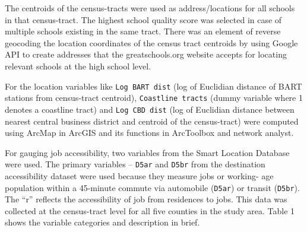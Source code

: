 \documentclass[10pt,letterpaper,onecolumn]{article}
\begin{document}
The centroids of the census-tracts were used as address/locations for all schools in that
census-tract. The highest school quality score was selected in case of
multiple schools existing in the same tract. There was an element of
reverse geocoding the location coordinates of the census tract centroids
by using Google API to create addresses that the greatschools.org
website accepts for locating relevant schools at the high school level.

For the location variables like \texttt{Log BART dist} (log of Euclidian
distance of BART stations from census-tract centroid), \texttt{Coastline
tracts} (dummy variable where 1 denotes a coastline tract) and \texttt{Log
CBD dist} (log of Euclidian distance between nearest central business
district and centroid of the census-tract) were computed using ArcMap in
ArcGIS and its functions in ArcToolbox and network analyst.

For gauging job accessibility, two variables from the Smart Location
Database were used. The primary variables -- \texttt{D5ar} and \texttt{D5br} from the
destination accessibility dataset were used because they measure jobs or
working- age population within a 45-minute commute via automobile (\texttt{D5ar})
or transit (\texttt{D5br}). The ``r'' reflects the accessibility of job from
residences to jobs. This data was collected at the census-tract level
for all five counties in the study area. Table 1 shows the variable
categories and description in brief.
\end{document}
